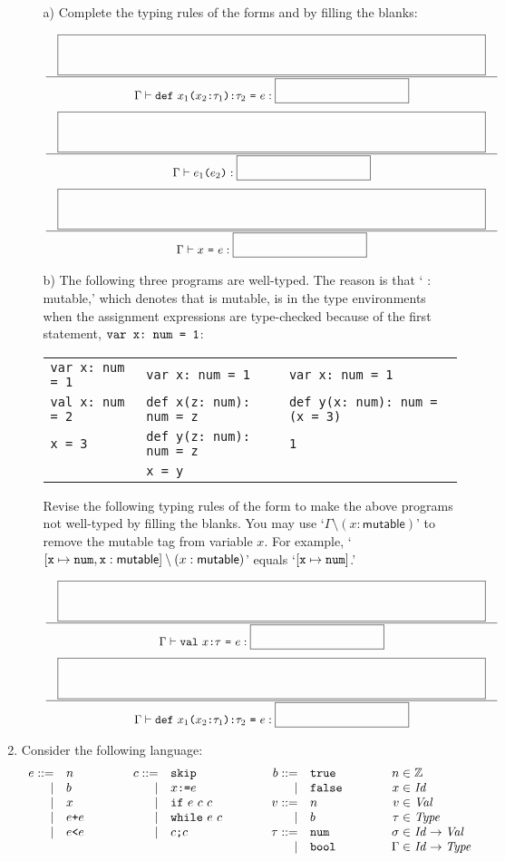 \begin{enumerate}
\begin{itemize}
\item[a)] Complete the typing rules 
of the forms  and 
by filling the blanks:

{
\[
\newinfrule
{ \lmblank }
{ \typed{\code{def}\ x_1\code{(}x_2\code{:}\tau_1\code{)}\code{:}\tau_2\ \code{=}\ e}{\sblank} }
\]
\[
\newinfrule
{ \lmblank }
{ \typed{e_1\code{(}e_2\code{)}}{\sblank} }
\]
\[
\newinfrule
{ \lmblank }
{ \typed{x\ \code{=}\ e}{\sblank} }
\]
}
\item[b)]
The following three programs are well-typed.
The reason is that
` $:$ \textsf{mutable},' which denotes that  is mutable,
is in the type environments when the assignment expressions are type-checked
because of the first statement, $\verb+var x: num = 1+$:

\begin{tabular}{|l@{\hskip35pt}|l@{\hskip35pt}|l}
\verb+var x: num = 1+&\verb+var x: num = 1+&\verb+var x: num = 1+\\
\verb+val x: num = 2+&\verb+def x(z: num): num = z+&\verb+def y(x: num): num = (x = 3)+\\
\verb+x = 3+&\verb+def y(z: num): num = z+&\verb+1+\\
&\verb+x = y+
\end{tabular}

Revise the following typing rules of the form 
to make the above programs not well-typed by filling the blanks.
You may use `$\Gamma\setminus(x:\textsf{mutable})$'
to remove the mutable tag from variable $x$.
For example, `$[\verb+x+\mapsto\verb+num+,\verb+x+:\textsf{mutable}]\setminus(x:\textsf{mutable})$'
equals `$[\verb+x+\mapsto\verb+num+]$.'

{
\[
\newinfrule
{ \lmblank }
{ \typed{\code{val}\ x\code{:}\tau\ \code{=}\ e}{\sblank} }
\]
\[
\newinfrule
{ \lmblank }
{ \typed{\code{def}\ x_1\code{(}x_2\code{:}\tau_1\code{)}\code{:}\tau_2\ \code{=}\ e}{\sblank} }
\]
}
\end{itemize}

\item Consider the following language:
\[
\begin{array}{rllrllrllr@{\hskip3pt}l}
e::= & n &\qquad& c::= & \verb+skip+ &\qquad& b::= & \verb+true+ &\qquad& n\in&\mathbb{Z}\\
\mid& b &&\mid& x\verb+:=+e &&\mid& \verb+false+ && x\in&\mathit{Id}\\
\mid& x &&\mid& \verb+if+\ e\ c\ c && v::= & n && v\in&\mathit{Val}\\
\mid& e\verb!+!e &&\mid& \verb+while+\ e\ c &&\mid& b && \tau\in&\mathit{Type}\\
\mid& e\verb!<!e &&\mid& c\verb+;+c &&\tau::= & \verb+num+ && \sigma\in&\mathit{Id}\rightarrow\mathit{Val}\\
&&&&&&\mid& \verb+bool+ && \Gamma\in&\mathit{Id}\rightarrow\mathit{Type}\\
\end{array}
\]


\end{enumerate}
